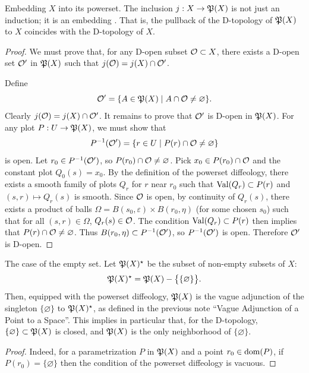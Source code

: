 \begin{Article}{Embedding $X$ into its powerset.}{}
  The inclusion $j: X \to {\mathfrak P}(X)$ is not just an induction;
  it is an embedding \cite[\textsection\,2.13]{PIZ13}.
  That is,
  the pullback of the D-topology of ${\mathfrak P}(X)$ to $X$ coincides with the D-topology of $X$.
\end{Article}

\begin{proof}
  We must prove that,
  for any D-open subset $\mathcal{O} \subset X$,
  there exists a D-open set $\mathcal{O}'$ in ${\mathfrak P}(X)$ such that $j(\mathcal{O}) = j(X) \cap \mathcal{O}'$.
  
  Define
  $$%
    \cO' = \{ A \in \fP(X) \mid A \cap \cO \neq \varnothing \}.
  $$%
  Clearly $j(\mathcal{O}) = j(X) \cap \mathcal{O}'$. It remains to prove that $\mathcal{O}'$ is D-open in ${\mathfrak P}(X)$.
  For any plot $P: U \to {\mathfrak P}(X)$,
  we must show that
  $$%
    P^{-1}(\cO') = \{ r \in U \mid P(r) \cap \cO \neq \varnothing \}
  $$%
  is open.
  Let $r_0 \in P^{-1}(\mathcal{O}')$,
  so $P(r_0) \cap \mathcal{O} \neq \varnothing$.
  Pick $x_0 \in P(r_0) \cap \mathcal{O}$ and the constant plot $Q_0(s) = x_0$.
  By the definition of the powerset diffeology,
  there exists a smooth family of plots $Q_r$ for $r$ near $r_0$ such that $\operatorname{Val}(Q_r) \subset P(r)$ and $(s,r) \mapsto Q_r(s)$ is smooth.
  Since $\mathcal{O}$ is open,
  by continuity of $Q_r(s)$,
  there exists a product of balls $\Omega = B(s_0, \varepsilon) \times B(r_0, \eta)$ (for some chosen $s_0$) such that for all $(s,r) \in \Omega$, $Q_r(s) \in \mathcal{O}$.
  The condition $\operatorname{Val}(Q_r) \subset P(r)$ then implies that $P(r) \cap \mathcal{O} \neq \varnothing$.
  Thus $B(r_0, \eta) \subset P^{-1}(\mathcal{O}')$,
  so $P^{-1}(\mathcal{O}')$ is open.
  Therefore $\mathcal{O}'$ is D-open.
\end{proof}

\begin{Article}{The case of the empty set.}{}
  Let ${\mathfrak P}(X)^\star$ be the subset of non-empty subsets of $X$:
  $$%
    \fP(X)^\star = \fP(X) \setminus \bigl\{ \{\varnothing\} \bigr\}.
  $$%
  Then,
  equipped with the powerset diffeology,
  ${\mathfrak P}(X)$ is the vague adjunction of the singleton $\{\varnothing\}$ to ${\mathfrak P}(X)^\star$,
  as defined in the previous note ``Vague Adjunction of a Point to a Space''.
  This implies in particular that,
  for the D-topology,
  $\{\varnothing\} \subset {\mathfrak P}(X)$ is closed,
  and ${\mathfrak P}(X)$ is the only neighborhood of $\{\varnothing\}$.
\end{Article}

\begin{proof}
  Indeed,
  for a parametrization $P$ in ${\mathfrak P}(X)$ and a point $r_0 \in \mathrm{dom}(P)$,
  if $P(r_0) = \{\varnothing\}$ then the condition of the powerset diffeology is vacuous.
\end{proof}

